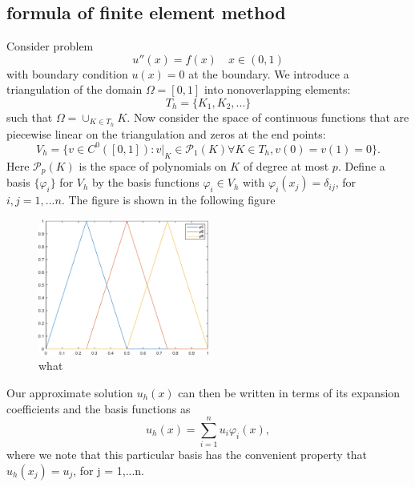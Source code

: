 \documentclass[11pt]{article}
\begin{document}
\subsection{formula of finite element method}
Consider problem  
\begin{equation}
\label{equ:poisson_equation}
	u''(x) = f(x) \quad x\in (0,1)
\end{equation}
with boundary condition $u(x)=0$ at the boundary. We introduce a triangulation of the domain $\Omega = [0,1] $ into nonoverlapping elements:
\begin{equation}
\label{equ:triangulation}
	T_h = \{K_1,K_2,...\}
\end{equation}
such that $\Omega = \cup_{K\in T_h}K$. Now consider the space of continuous functions that are piecewise linear on the triangulation and zeros at the end points:
\begin{equation}
\label{equ:basis}
	V_h =\{v\in C^0([0,1]):v|_{K} \in \mathcal{P}_1(K) \forall K \in T_h, v(0) = v(1) = 0\}.
\end{equation}
Here $\mathcal{P}_p(K)$ is the space of polynomials on $K$ of degree at most $p$. Define a basis $\{\varphi_i\}$ for $V_h$ by the basis functions $\varphi_i\in V_h$ with $\varphi_i(x_j) = \delta_{ij}$, for $i,j = 1,...n$. The figure is shown in the following figure
\begin{figure}[htp]
\centering
	\includegraphics[width=0.5\textwidth]{basis_figure}
	\caption{what}
\end{figure}
Our approximate solution $u_h(x)$ can then be written in terms of its expansion coefficients and the basis functions as
\begin{equation}
\label{equ:appro}
	u_h(x) = \sum_{i = 1}^n u_i\varphi_i(x),
\end{equation} 
where we note that this particular basis has the convenient property that $u_h(x_j) = u_j$, for j = 1,...n.
\end{document}
